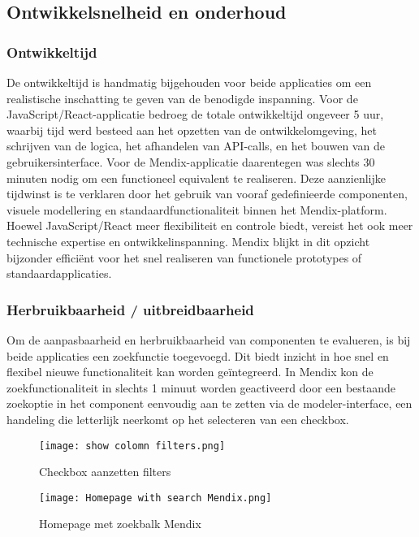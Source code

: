 \subsection{Ontwikkelsnelheid en onderhoud}

\subsubsection{Ontwikkeltijd}
De ontwikkeltijd is handmatig bijgehouden voor beide applicaties om een realistische inschatting te geven van de benodigde inspanning. Voor de JavaScript/React-applicatie bedroeg de totale ontwikkeltijd ongeveer 5 uur, waarbij tijd werd besteed aan het opzetten van de ontwikkelomgeving, het schrijven van de logica, het afhandelen van \gls{API}-calls, en het bouwen van de gebruikersinterface. Voor de Mendix-applicatie daarentegen was slechts 30 minuten nodig om een functioneel equivalent te realiseren. Deze aanzienlijke tijdwinst is te verklaren door het gebruik van vooraf gedefinieerde componenten, visuele modellering en standaardfunctionaliteit binnen het Mendix-platform. Hoewel JavaScript/React meer flexibiliteit en controle biedt, vereist het ook meer technische expertise en ontwikkelinspanning. Mendix blijkt in dit opzicht bijzonder efficiënt voor het snel realiseren van functionele prototypes of standaardapplicaties.

\subsubsection{Herbruikbaarheid / uitbreidbaarheid}
Om de aanpasbaarheid en herbruikbaarheid van componenten te evalueren, is bij beide applicaties een zoekfunctie toegevoegd. Dit biedt inzicht in hoe snel en flexibel nieuwe functionaliteit kan worden geïntegreerd. In Mendix kon de zoekfunctionaliteit in slechts 1 minuut worden geactiveerd door een bestaande zoekoptie in het component eenvoudig aan te zetten via de modeler-interface, een handeling die letterlijk neerkomt op het selecteren van een checkbox. 

\begin{figure}[H]
    \centering
    \captionsetup{justification=centering}
    \texttt{[image: show colomn filters.png]}
    \caption[\centering Checkbox aanzetten filters]{\label{fig:show-colomn-filters-Mendix} Checkbox aanzetten filters}
\end{figure}


\begin{figure}[H]
    \centering
    \captionsetup{justification=centering}
    \texttt{[image: Homepage with search Mendix.png]}
    \caption[\centering Homepage with search bar]{\label{fig:homepage-with-search-Mendix} Homepage met zoekbalk Mendix}
\end{figure}



